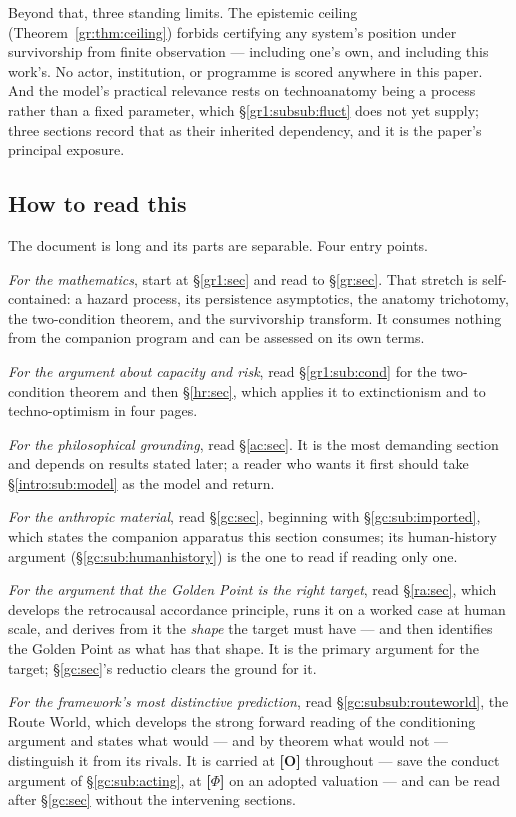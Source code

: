 \documentclass[11pt]{article}
\numberwithin{equation}{section}
\theoremstyle{plain}
\theoremstyle{definition}
\theoremstyle{remark}
\begin{document}
Beyond that, three standing limits. The epistemic ceiling
(Theorem~\ref{gr:thm:ceiling}) forbids certifying any system's position
under survivorship from finite observation --- including one's own, and
including this work's. No actor, institution, or programme is scored
anywhere in this paper. And the model's practical relevance rests on
technoanatomy being a process rather than a fixed parameter, which
\S\ref{gr1:subsub:fluct} does not yet supply; three sections record that
as their inherited dependency, and it is the paper's principal exposure.

\subsection{How to read this}\label{intro:sub:reading}

The document is long and its parts are separable. Four entry points.

\emph{For the mathematics}, start at \S\ref{gr1:sec} and read to
\S\ref{gr:sec}. That stretch is self-contained: a hazard process, its
persistence asymptotics, the anatomy trichotomy, the two-condition
theorem, and the survivorship transform. It consumes nothing from the
companion program and can be assessed on its own terms.

\emph{For the argument about capacity and risk}, read
\S\ref{gr1:sub:cond} for the two-condition theorem and then
\S\ref{hr:sec}, which applies it to extinctionism and to
techno-optimism in four pages.

\emph{For the philosophical grounding}, read \S\ref{ac:sec}. It is the
most demanding section and depends on results stated later; a reader who
wants it first should take \S\ref{intro:sub:model} as the model and
return.

\emph{For the anthropic material}, read \S\ref{gc:sec}, beginning with
\S\ref{gc:sub:imported}, which states the companion apparatus this
section consumes; its human-history argument
(\S\ref{gc:sub:humanhistory}) is the one to read if reading only one.

\emph{For the argument that the Golden Point is the right target}, read
\S\ref{ra:sec}, which develops the retrocausal accordance principle,
runs it on a worked case at human scale, and derives from it the
\emph{shape} the target must have --- and then identifies the Golden
Point as what has that shape. It is the primary argument for the target;
\S\ref{gc:sec}'s reductio clears the ground for it.

\emph{For the framework's most distinctive prediction}, read
\S\ref{gc:subsub:routeworld}, the Route World, which develops the strong
forward reading of the conditioning argument and states what would ---
and by theorem what would not --- distinguish it from its rivals. It is
carried at \textbf{[O]} throughout --- save the conduct argument of
\S\ref{gc:sub:acting}, at \textbf{[$\Phi$]} on an
adopted valuation --- and can be read after \S\ref{gc:sec}
without the intervening sections.
\end{document}
